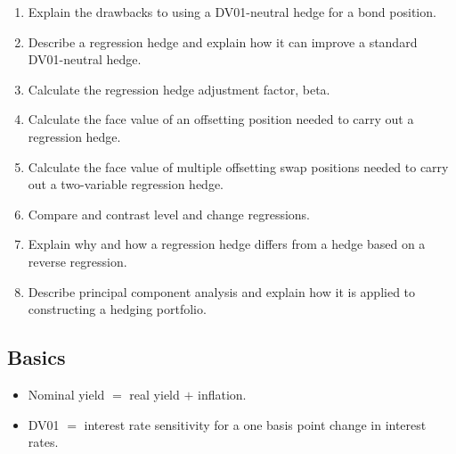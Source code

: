 
\begin{mrkeybox}[title={Learning objectives in this reading}]
\small
\begin{enumerate}[label=\textbf{\alph*.},leftmargin=1.7em]
\item Explain the drawbacks to using a DV01-neutral hedge for a bond position.
\item Describe a regression hedge and explain how it can improve a standard DV01-neutral hedge.
\item Calculate the regression hedge adjustment factor, beta.
\item Calculate the face value of an offsetting position needed to carry out a regression hedge.
\item Calculate the face value of multiple offsetting swap positions needed to carry out a
      two-variable regression hedge.
\item Compare and contrast level and change regressions.
\item Explain why and how a regression hedge differs from a hedge based on a reverse regression.
\item Describe principal component analysis and explain how it is applied to constructing a
      hedging portfolio.
\end{enumerate}
\end{mrkeybox}


\subsection{Basics}
\begin{itemize}
\item Nominal yield $=$ real yield $+$ inflation.
\item DV01 $=$ interest rate sensitivity for a one basis point change in interest rates.
\end{itemize}

